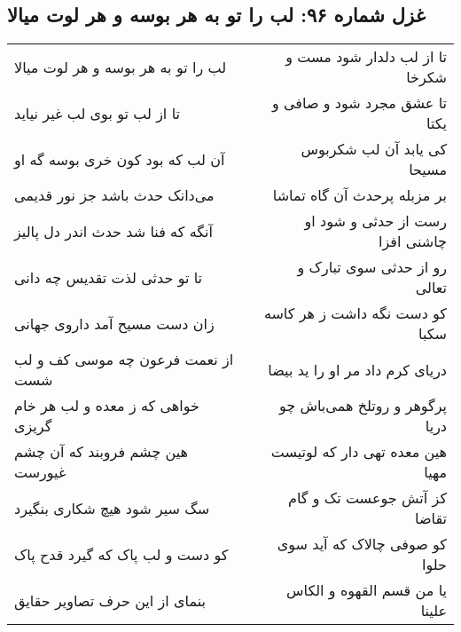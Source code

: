 \begin{center}
\section*{غزل شماره ۹۶: لب را تو به هر بوسه و هر لوت میالا}
\label{sec:0096}
\begin{longtable}{l p{0.5cm} r}
لب را تو به هر بوسه و هر لوت میالا
&&
تا از لب دلدار شود مست و شکرخا
\\
تا از لب تو بوی لب غیر نیاید
&&
تا عشق مجرد شود و صافی و یکتا
\\
آن لب که بود کون خری بوسه گه او
&&
کی یابد آن لب شکربوس مسیحا
\\
می‌دانک حدث باشد جز نور قدیمی
&&
بر مزبله پرحدث آن گاه تماشا
\\
آنگه که فنا شد حدث اندر دل پالیز
&&
رست از حدثی و شود او چاشنی افزا
\\
تا تو حدثی لذت تقدیس چه دانی
&&
رو از حدثی سوی تبارک و تعالی
\\
زان دست مسیح آمد داروی جهانی
&&
کو دست نگه داشت ز هر کاسه سکبا
\\
از نعمت فرعون چه موسی کف و لب شست
&&
دریای کرم داد مر او را ید بیضا
\\
خواهی که ز معده و لب هر خام گریزی
&&
پرگوهر و روتلخ همی‌باش چو دریا
\\
هین چشم فروبند که آن چشم غیورست
&&
هین معده تهی دار که لوتیست مهیا
\\
سگ سیر شود هیچ شکاری بنگیرد
&&
کز آتش جوعست تک و گام تقاضا
\\
کو دست و لب پاک که گیرد قدح پاک
&&
کو صوفی چالاک که آید سوی حلوا
\\
بنمای از این حرف تصاویر حقایق
&&
یا من قسم القهوه و الکاس علینا
\\
\end{longtable}
\end{center}
